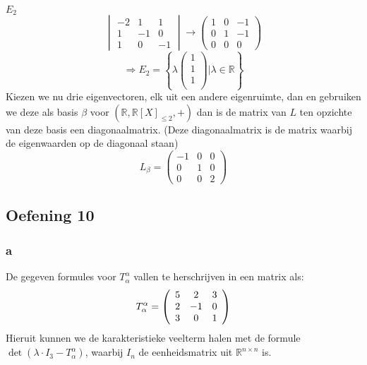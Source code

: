 \documentclass[lineaire_algebra_oplossingen.tex]{subfiles}
\begin{document}
\emph{$E_2$}\\
\[
\begin{vmatrix}
-2 & 1 & 1\\
1 & -1& 0\\
1 & 0 & -1
\end{vmatrix}
\rightarrow
\begin{pmatrix}
1 & 0 & -1\\
0 & 1 & -1\\
0 & 0 & 0
\end{pmatrix}
\]
\[
\Rightarrow E_2 = 
\left\{ 
\lambda
\begin{pmatrix}
1\\1\\1\\
\end{pmatrix}
| \lambda \in \mathbb{R}
\right\}
\]
Kiezen we nu drie eigenvectoren, elk uit een andere eigenruimte, dan en gebruiken we deze als basis $\beta$ voor $(\mathbb{R},\mathbb{R}[X]_{\le 2},+)$ dan is de matrix van $L$ ten opzichte van deze basis een diagonaalmatrix.
(Deze diagonaalmatrix is de matrix waarbij de eigenwaarden op de diagonaal staan)
\[
L_\beta = 
\begin{pmatrix}
-1 & 0 & 0\\
 0 & 1 & 0\\
 0 & 0 & 2
\end{pmatrix}
\]


\subsection{Oefening 10}

\subsubsection*{a}
De gegeven formules voor $T^\alpha_\alpha$ vallen te herschrijven in een matrix als:
\[
T^\alpha_\alpha = \left(
\begin{array}{c c c}
5 & 2 & 3 \\
2 & -1 & 0 \\
3 & 0 & 1 \\
\end{array}
\right)
\]
Hieruit kunnen we de karakteristieke veelterm halen met de formule $\det(\lambda \cdot I_3 - T^\alpha_\alpha)$, waarbij $I_n$ de eenheidsmatrix uit $\mathbb{R}^{n\times n}$ is.
\end{document}

